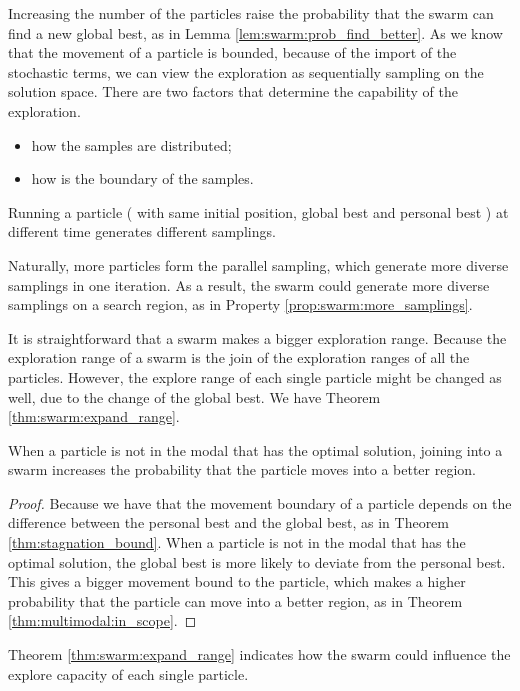 Increasing the number of the particles raise the probability that the swarm can find a new global best, as in Lemma \ref{lem:swarm:prob_find_better}.
As we know that the movement of a particle is bounded, because of the import of the stochastic terms, we can view the exploration as sequentially sampling on the solution space.
There are two factors that determine the capability of the exploration.
\begin{itemize}
\item how the samples are distributed;
\item how is the boundary of the samples.
\end{itemize}

\begin{myprop}
\label{prop:swarm:more_samplings}
Running a particle ( with same initial position, global best and personal best ) at different time generates different samplings.
\end{myprop}
Naturally, more particles form the parallel sampling, which generate more diverse samplings in one iteration.
As a result, the swarm could generate more diverse samplings on a search region, as in Property \ref{prop:swarm:more_samplings}.

It is straightforward that a swarm makes a bigger exploration range.
Because the exploration range of a swarm is the join of the exploration ranges of all the particles.
However, the explore range of each single particle might be changed as well, due to the change of the global best.
We have Theorem \ref{thm:swarm:expand_range}.

\begin{mythm}
\label{thm:swarm:expand_range}
When a particle is not in the modal that has the optimal solution, joining into a swarm increases the probability that the particle moves into a better region.
\begin{proof}
Because we have that the movement boundary of a particle depends on the difference between the personal best and the global best, as in Theorem \ref{thm:stagnation_bound}.
When a particle is not in the modal that has the optimal solution, the global best is more likely to deviate from the personal best.
This gives a bigger movement bound to the particle, which makes a higher probability that the particle can move into a better region, as in Theorem \ref{thm:multimodal:in_scope}.
\end{proof}
\end{mythm}

Theorem \ref{thm:swarm:expand_range} indicates how the swarm could influence the explore capacity of each single particle.

